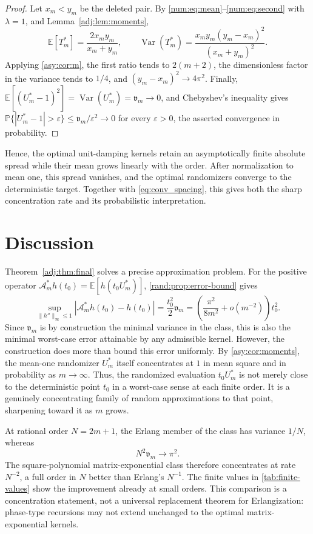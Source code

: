 \documentclass[11pt]{article}
\numberwithin{equation}{section}
\theoremstyle{definition}
\theoremstyle{remark}
\newcommand{\E}{\mathbb E}
\newcommand{\Var}{\operatorname{Var}}
\newcommand{\Aop}{\mathcal A}
\begin{document}
\begin{proof}
Let $x_m<y_m$ be the deleted pair. By \eqref{num:eq:mean}--\eqref{num:eq:second} with $\lambda=1$, and Lemma~\ref{adj:lem:moments},
\[
 \E[T_m^*]=\frac{2x_my_m}{x_m+y_m},
 \qquad
 \Var(T_m^*)
 =
 \frac{x_my_m(y_m-x_m)^2}{(x_m+y_m)^2}.
\]
Applying \cref{asy:cor:m}, the first ratio tends to $2(m+2)$, the dimensionless factor in the variance tends to $1/4$, and $(y_m-x_m)^2\to4\pi^2$. Finally, $\E[(U_m^*-1)^2]=\Var(U_m^*)=\mathfrak v_m\to0$, and Chebyshev's inequality gives $\mathbb P\{|U_m^*-1|>\varepsilon\}\le\mathfrak v_m/\varepsilon^2\to0$ for every $\varepsilon>0$, the asserted convergence in probability.
\end{proof}

Hence, the optimal unit-damping kernels retain an asymptotically finite absolute spread while their mean grows linearly with the order. After normalization to mean one, this spread vanishes, and the optimal randomizers converge to the deterministic target. Together with \eqref{eq:conv_spacing},
this gives both the sharp concentration rate and its probabilistic interpretation.


\section{Discussion}\label{sec:discussion}
Theorem~\ref{adj:thm:final} solves a precise approximation problem. For the positive
operator $\Aop_m^*h(t_0)=\E[h(t_0U_m^*)]$, \cref{rand:prop:error-bound} gives
\[
 \sup_{\lVert h''\rVert_\infty\le1}
 |\Aop_m^*h(t_0)-h(t_0)|
 =\frac{t_0^2}{2}\mathfrak v_m
 =\left(\frac{\pi^2}{8m^2}+o(m^{-2})\right)t_0^2.
\]
Since $\mathfrak v_m$ is by construction the minimal variance in
the class, this is also the minimal worst-case error attainable by any
admissible kernel. However, the construction does more than bound this error uniformly. By \cref{asy:cor:moments}, the mean-one randomizer $U_m^*$ itself concentrates at $1$ in mean square and in probability as $m\to\infty$. Thus, the randomized evaluation $t_0U_m^*$ is not merely close to the deterministic point $t_0$ in a worst-case sense at each finite order. It is a genuinely concentrating family of random approximations to that point, sharpening toward it as $m$ grows. 

At rational order $N=2m+1$, the Erlang member of the class has variance
$1/N$, whereas
\[
 N^2\mathfrak v_m\longrightarrow\pi^2.
\]
The square-polynomial matrix-exponential class therefore
concentrates at rate $N^{-2}$, a full order in $N$ better than Erlang's
$N^{-1}$. The finite values in
\cref{tab:finite-values} show the improvement already at small orders. This
comparison is a concentration statement, not a universal replacement theorem
for Erlangization: phase-type recursions may not extend unchanged to the
optimal matrix-exponential kernels.
\end{document}
